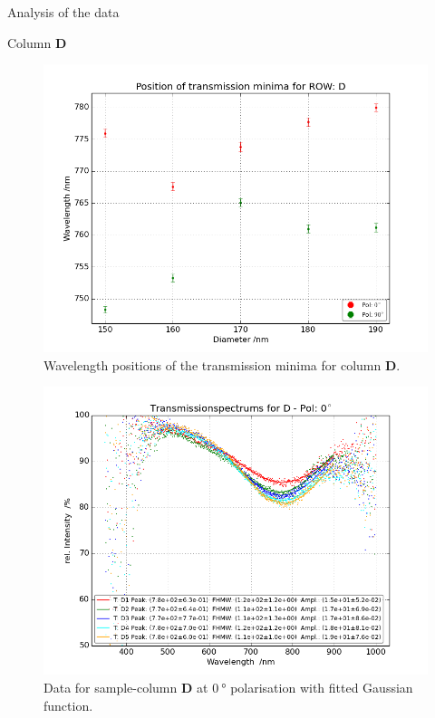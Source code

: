\documentclass[pdftex, a4paper,11pt, twoside, UKenglish]{report}
\begin{document}
\begin{chapter}{Analysis of the data}
\begin{section}{Column \textbf{D}}
      \begin{figure}[b!]
        \centering
        \includegraphics[width=\textwidth]{Figures/MinimaPosD.png}
        \caption{Wavelength positions of the transmission minima for column
            \textbf{D}.}
        \label{fig:MinimaPosD}
      \end{figure}
      \newpage
      \begin{figure}[ht!]
        \centering
        \begin{minipage}{.95\textwidth}
          \centering
          \includegraphics[width=\textwidth]
              {Figures/TransspecFIT_DPol0.png}
          \caption{Data for sample-column \textbf{D} at $\SI{0}{\degree}$
              polarisation with fitted Gaussian function.}

\end{minipage}
\end{figure}
\end{section}
\end{chapter}
\end{document}
